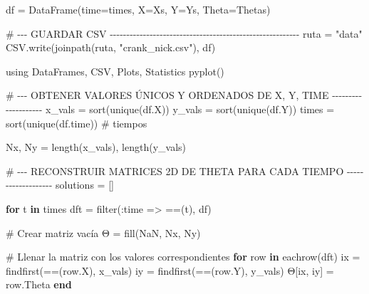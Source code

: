 \documentclass[
  spanish,
  us-letterpaper,
]{scrreprt}
\newenvironment{Shaded}{\begin{snugshade}}{\end{snugshade}}
\newcommand{\BuiltInTok}[1]{\textcolor[rgb]{0.00,0.23,0.31}{#1}}
\newcommand{\CommentTok}[1]{\textcolor[rgb]{0.37,0.37,0.37}{#1}}
\newcommand{\ConstantTok}[1]{\textcolor[rgb]{0.56,0.35,0.01}{#1}}
\newcommand{\ControlFlowTok}[1]{\textcolor[rgb]{0.00,0.23,0.31}{\textbf{#1}}}
\newcommand{\FunctionTok}[1]{\textcolor[rgb]{0.28,0.35,0.67}{#1}}
\newcommand{\ImportTok}[1]{\textcolor[rgb]{0.00,0.46,0.62}{#1}}
\newcommand{\KeywordTok}[1]{\textcolor[rgb]{0.00,0.23,0.31}{\textbf{#1}}}
\newcommand{\NormalTok}[1]{\textcolor[rgb]{0.00,0.23,0.31}{#1}}
\newcommand{\OperatorTok}[1]{\textcolor[rgb]{0.37,0.37,0.37}{#1}}
\newcommand{\StringTok}[1]{\textcolor[rgb]{0.13,0.47,0.30}{#1}}
\theoremstyle{plain}
\theoremstyle{definition}
\theoremstyle{remark}
\begin{document}
\begin{Shaded}
\begin{Highlighting}[]
\NormalTok{df }\OperatorTok{=} \FunctionTok{DataFrame}\NormalTok{(time}\OperatorTok{=}\NormalTok{times, X}\OperatorTok{=}\NormalTok{Xs, Y}\OperatorTok{=}\NormalTok{Ys, Theta}\OperatorTok{=}\NormalTok{Thetas)}

\CommentTok{\# {-}{-}{-} GUARDAR CSV {-}{-}{-}{-}{-}{-}{-}{-}{-}{-}{-}{-}{-}{-}{-}{-}{-}{-}{-}{-}{-}{-}{-}{-}{-}{-}{-}{-}{-}{-}{-}{-}{-}{-}{-}{-}{-}{-}{-}{-}{-}{-}{-}{-}{-}{-}{-}{-}{-}{-}{-}{-}{-}{-}{-}{-}{-}}
\NormalTok{ruta }\OperatorTok{=} \StringTok{"data"}
\NormalTok{CSV.}\FunctionTok{write}\NormalTok{(}\FunctionTok{joinpath}\NormalTok{(ruta, }\StringTok{"crank\_nick.csv"}\NormalTok{), df)}
\end{Highlighting}
\end{Shaded}

\begin{Shaded}
\begin{Highlighting}[]
\ImportTok{using} \BuiltInTok{DataFrames}\NormalTok{, }\BuiltInTok{CSV}\NormalTok{, }\BuiltInTok{Plots}\NormalTok{, }\BuiltInTok{Statistics}
\FunctionTok{pyplot}\NormalTok{()}

\CommentTok{\# {-}{-}{-} OBTENER VALORES ÚNICOS Y ORDENADOS DE X, Y, TIME {-}{-}{-}{-}{-}{-}{-}{-}{-}{-}{-}{-}{-}{-}{-}{-}{-}{-}{-}{-}}
\NormalTok{x\_vals }\OperatorTok{=} \FunctionTok{sort}\NormalTok{(}\FunctionTok{unique}\NormalTok{(df.X))}
\NormalTok{y\_vals }\OperatorTok{=} \FunctionTok{sort}\NormalTok{(}\FunctionTok{unique}\NormalTok{(df.Y))}
\NormalTok{times }\OperatorTok{=} \FunctionTok{sort}\NormalTok{(}\FunctionTok{unique}\NormalTok{(df.time))  }\CommentTok{\# tiempos}

\NormalTok{Nx, Ny }\OperatorTok{=} \FunctionTok{length}\NormalTok{(x\_vals), }\FunctionTok{length}\NormalTok{(y\_vals)}

\CommentTok{\# {-}{-}{-} RECONSTRUIR MATRICES 2D DE THETA PARA CADA TIEMPO {-}{-}{-}{-}{-}{-}{-}{-}{-}{-}{-}{-}{-}{-}{-}{-}{-}{-}{-}}
\NormalTok{solutions }\OperatorTok{=}\NormalTok{ []}

\ControlFlowTok{for}\NormalTok{ t }\KeywordTok{in}\NormalTok{ times}
\NormalTok{    dft }\OperatorTok{=} \FunctionTok{filter}\NormalTok{(}\OperatorTok{:}\NormalTok{time }\OperatorTok{=\textgreater{}} \OperatorTok{==}\NormalTok{(t), df)}

    \CommentTok{\# Crear matriz vacía}
\NormalTok{    Θ }\OperatorTok{=} \FunctionTok{fill}\NormalTok{(}\ConstantTok{NaN}\NormalTok{, Nx, Ny)}

    \CommentTok{\# Llenar la matriz con los valores correspondientes}
    \ControlFlowTok{for}\NormalTok{ row }\KeywordTok{in} \FunctionTok{eachrow}\NormalTok{(dft)}
\NormalTok{        ix }\OperatorTok{=} \FunctionTok{findfirst}\NormalTok{(}\OperatorTok{==}\NormalTok{(row.X), x\_vals)}
\NormalTok{        iy }\OperatorTok{=} \FunctionTok{findfirst}\NormalTok{(}\OperatorTok{==}\NormalTok{(row.Y), y\_vals)}
\NormalTok{        Θ[ix, iy] }\OperatorTok{=}\NormalTok{ row.Theta}
    \ControlFlowTok{end}


\end{Highlighting}
\end{Shaded}
\end{document}
